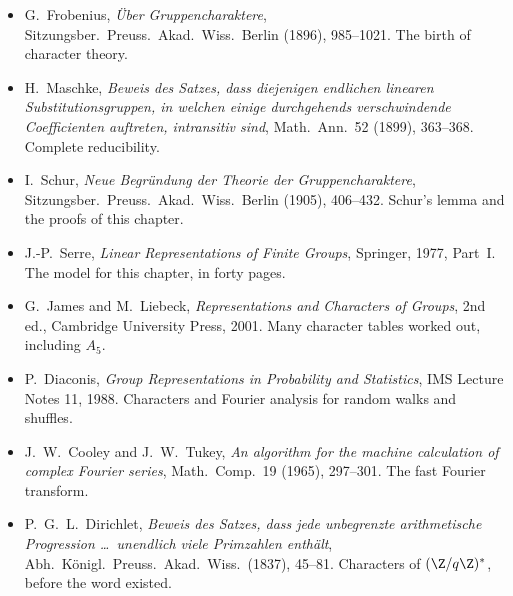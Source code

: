 \begin{itemize}
\item G.~Frobenius, \emph{Über Gruppencharaktere}, Sitzungsber.\ Preuss.\ Akad.\ Wiss.\ Berlin (1896), 985--1021. The birth of character theory.
\item H.~Maschke, \emph{Beweis des Satzes, dass diejenigen endlichen linearen Substitutionsgruppen, in welchen einige durchgehends verschwindende Coefficienten auftreten, intransitiv sind}, Math.\ Ann.\ 52 (1899), 363--368. Complete reducibility.
\item I.~Schur, \emph{Neue Begründung der Theorie der Gruppencharaktere}, Sitzungsber.\ Preuss.\ Akad.\ Wiss.\ Berlin (1905), 406--432. Schur's lemma and the proofs of this chapter.
\item J.-P.~Serre, \emph{Linear Representations of Finite Groups}, Springer, 1977, Part~I. The model for this chapter, in forty pages.
\item G.~James and M.~Liebeck, \emph{Representations and Characters of Groups}, 2nd ed., Cambridge University Press, 2001. Many character tables worked out, including $A_5$.
\item P.~Diaconis, \emph{Group Representations in Probability and Statistics}, IMS Lecture Notes 11, 1988. Characters and Fourier analysis for random walks and shuffles.
\item J.~W.~Cooley and J.~W.~Tukey, \emph{An algorithm for the machine calculation of complex Fourier series}, Math.\ Comp.\ 19 (1965), 297--301. The fast Fourier transform.
\item P.~G.~L.~Dirichlet, \emph{Beweis des Satzes, dass jede unbegrenzte arithmetische Progression \dots\ unendlich viele Primzahlen enthält}, Abh.\ Königl.\ Preuss.\ Akad.\ Wiss.\ (1837), 45--81. Characters of $(\Z/q\Z)^*$, before the word existed.
\end{itemize}
